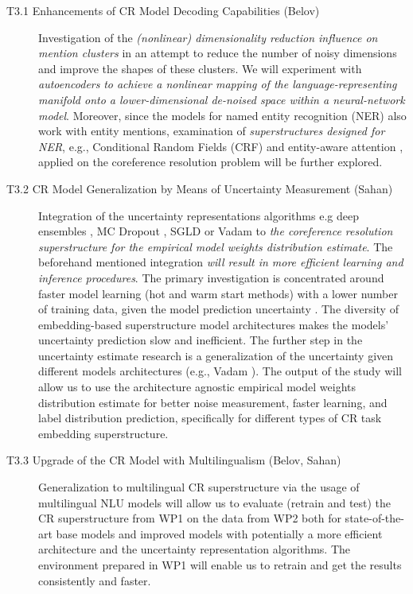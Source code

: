 \begin{description}
	\item [T3.1 Enhancements of CR Model Decoding Capabilities (Belov)] Investigation of the \textit{(nonlinear) dimensionality reduction influence on mention clusters} in an attempt to reduce the number of noisy dimensions and improve the shapes of these clusters. We will experiment with \textit{autoencoders} \cite{autoencoders-Zabalza2016,autoencoders-Sahay2019} \textit{to achieve a nonlinear mapping of the language-representing manifold onto a lower-dimensional de-noised space within a neural-network model}. Moreover, since the models for named entity recognition (NER) also work with entity mentions, examination of \textit{superstructures designed for NER}, e.g., Conditional Random Fields (CRF) \cite{ner-Strakova2019,ner-Zhanming2019} and entity-aware attention \cite{ner-Yamada2020}, applied on the coreference resolution problem will be further explored.

	\item [T3.2 CR Model Generalization by Means of Uncertainty Measurement (Sahan)] Integration of the uncertainty representations algorithms e.g deep ensembles \cite{lakshminarayanan2016simple}, MC Dropout \cite{gal2017deep}, SGLD \cite{welling2011bayesian} or Vadam \cite{khan2018fast} to \textit{the coreference resolution superstructure for the empirical model weights distribution estimate}. The beforehand mentioned integration  \textit{will result in more efficient learning and inference procedures}. The primary investigation is concentrated around faster model learning (hot and warm start methods) with a lower number of training data, given the model prediction uncertainty \cite{sahan2021active}. The diversity of embedding-based superstructure model architectures makes the models' uncertainty prediction slow and inefficient. The further step in the uncertainty estimate research is a generalization of the uncertainty given different models architectures (e.g., Vadam \cite{khan2018fast}). The output of the study will allow us to use the architecture agnostic empirical model weights distribution estimate for better noise measurement, faster learning, and label distribution prediction, specifically for different types of CR task embedding superstructure.
	
	\item [T3.3 Upgrade of the CR Model with Multilingualism (Belov, Sahan)] Generalization to multilingual CR superstructure via the usage of multilingual NLU models will allow us to evaluate (retrain and test) the CR superstructure from WP1 on the data from WP2 both for state-of-the-art base models and improved models with potentially a more efficient architecture and the uncertainty representation algorithms. The environment prepared in WP1 will enable us to retrain and get the results consistently and faster. 
	


\end{description}
